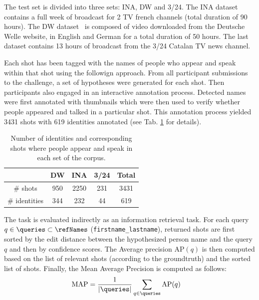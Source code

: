  The test set is divided into three sets: INA, DW and 3/24. The INA dataset contains a full week of broadcast for 2 TV french channels (total duration of 90 hours). The DW dataset~\cite{EUMSSI} is composed of video downloaded from the Deutsche Welle website, in English and German for a total duration of 50 hours. The last dataset contains 13 hours of broadcast from the 3/24 Catalan TV news channel. 

Each shot has been tagged with the names of people who appear and speak within that shot using the followign approach.
%
From all participant submissions to the challenge, a set of hypotheses were generated for each shot. 
Then participants also engaged in an interactive annotation process.
Detected names were first annotated with  thumbnails which were then used to verify whether people appeared and talked in a particular shot. 
This annotation process yielded 3431 shots with 619 identities annotated (see Tab. \ref{tab:stats} for details).

\begin{table}[tb]
\centering
\caption{Number of identities and corresponding shots where people appear and speak in each set of the corpus.}
\vspace*{-2mm}
\begin{tabular}{c|c|c|c|c|}
\cline{2-5}
    						   		& DW  	& INA 	& 3/24  & Total\\ \hline
 \multicolumn{1}{|c|}{\# shots} 		& 950	& 2250  & 231 & 3431\\ \hline

 \multicolumn{1}{|c|}{\# identities} 	& 344	& 232   & 44 & 619 \\ \hline
								
\end{tabular}
%
\vspace*{-5mm}
\label{tab:stats}
\end{table}



 The task is evaluated indirectly as an information retrieval task. %
%
For each query $q \in \queries \subset \refNames$ (\texttt{first\-name\_lastname}), returned shots are first sorted by the edit distance between the hypothesized person name and the query $q$ and then by confidence scores.
The Average precision $\text{AP}(q)$ is then computed based on the list of relevant shots (according to the groundtruth) and the sorted list of shots. Finally, the Mean Average Precision is computed as follows:
\begin{align}
            \text{MAP} & = \frac{1}{|\queries|} \sum_{q \in \queries} \text{AP}(q) \nonumber
\end{align}

